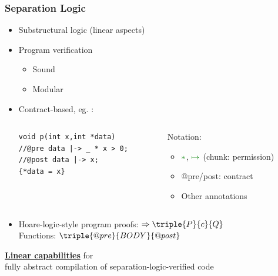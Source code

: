 \documentclass{beamer}
\begin{document}
\begin{frame}[fragile]
\frametitle{Separation Logic} 
\begin{itemize}
\item Substructural logic (linear aspects)
\item Program verification
\begin{itemize}
\item Sound %
\item Modular %
\end{itemize}
\item Contract-based, eg. :\\
\begin{columns}%
\begin{column}{0.55\textwidth}
\begin{lstlisting}[style=CStylenoNum, captionpos = t, xleftmargin = 4em]
void p(int x,int *data)
//@pre data |-> _ * x > 0;
//@post data |-> x;
{*data = x}
\end{lstlisting}
\end{column}
\begin{column}{0.45\textwidth}
Notation:
\begin{itemize}
\item $\textcolor{mGreen}{\ast}$, $\textcolor{mGreen}{\mapsto}$ (chunk: permission)
\item @pre/post: contract
\item Other annotations
\end{itemize}
\end{column}
\end{columns}
\vspace{1em}
\item Hoare-logic-style program proofs: $\Rightarrow \triple{P}{c}{Q}$\\
	\quad Functions: $\triple{@pre}{BODY}{@post}$
\end{itemize}
\end{frame}

\begin{frame}[plain,c]

\begin{center}
\Huge \underline{\textbf{Linear capabilities}} for\\  fully abstract
compilation of separation-logic-verified code
\end{center}

\end{frame}


\end{document}
